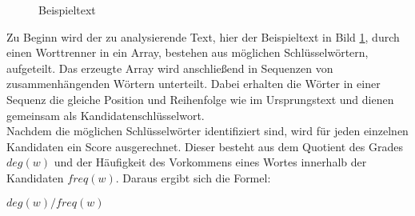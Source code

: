 \begin{figure}[h!]
	\caption{Beispieltext}
	\label{fig:text}
\end{figure}

Zu Beginn wird der zu analysierende Text, hier der Beispieltext in  Bild \ref{fig:text}, durch einen Worttrenner in ein Array, bestehen aus möglichen Schlüsselwörtern, aufgeteilt. Das erzeugte Array wird anschließend in Sequenzen von zusammenhängenden Wörtern unterteilt. Dabei erhalten die Wörter in einer Sequenz die gleiche Position und Reihenfolge wie im Ursprungstext und dienen gemeinsam als Kandidatenschlüsselwort.\cite{rose2010automatic}\\		
Nachdem die möglichen Schlüsselwörter identifiziert sind, wird für jeden einzelnen Kandidaten ein Score ausgerechnet. Dieser besteht aus dem Quotient des Grades $deg(w)$ und der Häufigkeit des Vorkommens eines Wortes innerhalb der Kandidaten $freq(w)$. Daraus ergibt sich die Formel:
\begin{center}
	$deg(w)/freq(w) $
\end{center}	

